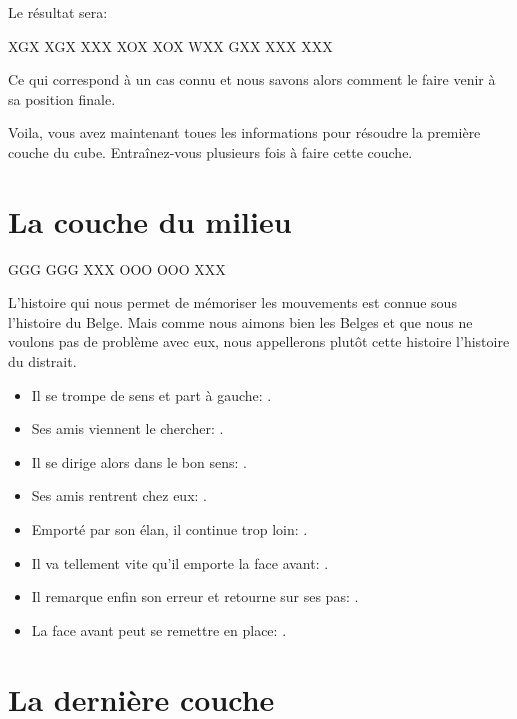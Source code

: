 \documentclass[10pt,paper=a5,pagesize]{scrbook}
\begin{document}
Le résultat sera:

\begin{center}
	\RubikFaceRight%
	{X}{G}{X}%
	{X}{G}{X}%
	{X}{X}{X}
	\RubikFaceFront%
	{X}{O}{X}%
	{X}{O}{X}%
	{W}{X}{X}
	\RubikFaceDown%
	{G}{X}{X}%
	{X}{X}{X}%
	{X}{X}{X}
	
\end{center} 

Ce qui correspond à un cas connu et nous savons alors comment le faire
venir à sa position finale.

Voila, vous avez maintenant toues les informations pour résoudre la première
couche du cube. Entraînez-vous plusieurs fois à faire cette couche.

\chapter{La couche du milieu}

{
	\centering
	\RubikFaceRight%
	{G}{G}{G}%
	{G}{G}{G}%
	{X}{X}{X}
	\RubikFaceFront%
	{O}{O}{O}%
	{O}{O}{O}%
	{X}{X}{X}
	\par
}

L'histoire qui nous permet de mémoriser les mouvements est connue sous \og l'histoire du Belge\fg{}. Mais comme nous aimons bien les Belges et que nous ne voulons pas de problème avec eux, nous appellerons plutôt cette histoire \og l'histoire du distrait\fg{}.

\begin{itemize}
	\item Il se trompe de sens et part à gauche: .
	\item Ses amis viennent le chercher: .
	\item Il se dirige alors dans le bon sens: .
	\item Ses amis rentrent chez eux: .
	\item Emporté par son élan, il continue trop loin: .
	\item Il va tellement vite qu'il emporte la face avant: .
	\item Il remarque enfin son erreur et retourne sur ses pas: .
	\item La face avant peut se remettre en place: .
	
\end{itemize}


\chapter{La dernière couche}
\end{document}
